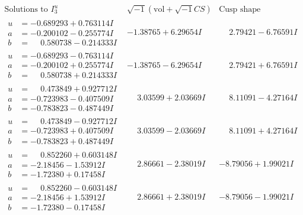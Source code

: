 \documentclass[1p]{elsarticle_modified}
\theoremstyle{definition}
\newcommand{\I}{\sqrt{-1}}
\begin{document}
$$\begin{array}{c|c|c}  
\text{Solutions to }I^u_{3}& \I (\text{vol} + \sqrt{-1}CS) & \text{Cusp shape}\\
 \hline 
\begin{aligned}
u &= -0.689293 + 0.763114 I \\
a &= -0.200102 - 0.255774 I \\
b &= \phantom{-}0.580738 - 0.214333 I\end{aligned}
 & -1.38765 + 6.29654 I & \phantom{-}2.79421 - 6.76591 I \\ \hline\begin{aligned}
u &= -0.689293 - 0.763114 I \\
a &= -0.200102 + 0.255774 I \\
b &= \phantom{-}0.580738 + 0.214333 I\end{aligned}
 & -1.38765 - 6.29654 I & \phantom{-}2.79421 + 6.76591 I \\ \hline\begin{aligned}
u &= \phantom{-}0.473849 + 0.927712 I \\
a &= -0.723983 - 0.407509 I \\
b &= -0.783823 - 0.487449 I\end{aligned}
 & \phantom{-}3.03599 + 2.03669 I & \phantom{-}8.11091 - 4.27164 I \\ \hline\begin{aligned}
u &= \phantom{-}0.473849 - 0.927712 I \\
a &= -0.723983 + 0.407509 I \\
b &= -0.783823 + 0.487449 I\end{aligned}
 & \phantom{-}3.03599 - 2.03669 I & \phantom{-}8.11091 + 4.27164 I \\ \hline\begin{aligned}
u &= \phantom{-}0.852260 + 0.603148 I \\
a &= -2.18456 - 1.53912 I \\
b &= -1.72380 + 0.17458 I\end{aligned}
 & \phantom{-}2.86661 - 2.38019 I & -8.79056 + 1.99021 I \\ \hline\begin{aligned}
u &= \phantom{-}0.852260 - 0.603148 I \\
a &= -2.18456 + 1.53912 I \\
b &= -1.72380 - 0.17458 I\end{aligned}
 & \phantom{-}2.86661 + 2.38019 I & -8.79056 - 1.99021 I \\ \hline\begin{aligned}

\end{aligned}
\end{array}$$
\end{document}
